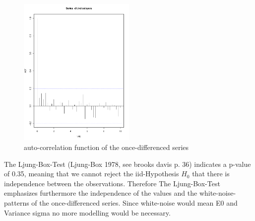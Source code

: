 \documentclass[11pt,a4paper]{article}
\begin{document}
\begin{figure}[!htb]
\centering
\includegraphics[angle=0,
width=0.5\textwidth]{diff1_acf}
\caption{auto-correlation function of the once-differenced series
\label{fig:diff1_acf}}
\end{figure}
The Ljung-Box-Test (Ljung-Box 1978, see brooks davis p. 36) indicates a p-value of 0.35, meaning that we cannot reject the iid-Hypothesis $H_0$ that there is independence between the observations. Therefore The Ljung-Box-Test emphasizes furthermore the independence of the values and the white-noise-patterns of the once-differenced series. Since white-noise would mean E0 and Variance sigma no more modelling would be necessary. 
\end{document}
